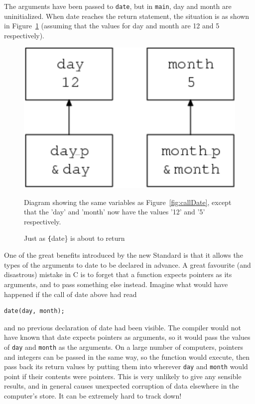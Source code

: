    The arguments have been passed to \texttt{date}, but in
    \texttt{main}, day and month are uninitialized. When date reaches
    the return statement,
    the situation is as shown in Figure~\ref{fig:callDateRet}
    (assuming that the values for day and month are 12 and
    5 respectively).


    \begin{figure}[htb]\centering
      \includegraphics[type=pdf,read=.pdf,ext=.pdf,scale=0.5]
      {figure/5.6_callDateRet}
      \caption*{Diagram showing the same variables as Figure~\ref{fig:callDate},
        except that the 'day' and 'month'
        now have the values '12' and '5' respectively.}
      \caption{\label{fig:callDateRet}
        Just as \texttt\{date\} is about to return}
    \end{figure}



   One of the great benefits introduced by the new Standard is that it
    allows the types of the arguments to date to be declared in advance.
    A great favourite (and disastrous) mistake in C is to forget that
    a function expects pointers as its arguments, and to pass something else
    instead. Imagine what would have happened if the call of date above had
    read


   \begin{Verbatim}
date(day, month);
\end{Verbatim}

   and no previous declaration of date had been visible. The compiler
    would not have known that date expects pointers as arguments, so it
    would pass the \kint{} values of \texttt{day} and
    \texttt{month} as the arguments. On a large number of computers,
    pointers and integers can be passed in the same way, so the function
    would execute, then pass back its return values by putting them into
    wherever \texttt{day} and \texttt{month} would point if their
    contents were pointers. This is very unlikely to give any sensible
    results, and in general causes unexpected corruption of data elsewhere
    in the computer's store. It can be extremely hard to track down!


